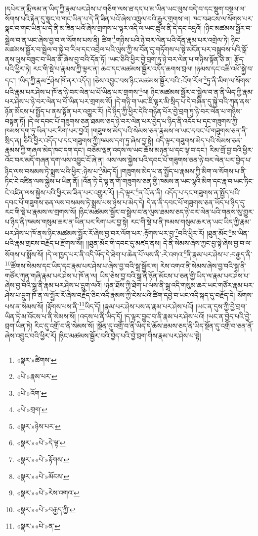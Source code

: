།དཔེར་ན་རྨི་ལམ་ན་ཡིད་ཀྱི་རྣམ་པར་ཤེས་པ་གཅིག་ལས་ཐ་དད་པ་མ་ཡིན་ཡང་ལུས་བདེ་བ་དང་སྡུག་བསྔལ་ལ་སོགས་པའི་རྟེན་དུ་སྣང་བ་གང་ཡིན་པ་དེ་ནི་ཟིན་པའོ་ཞེས་འཁྲུལ་བའི་རྒྱུར་གྲགས་ལ། ཁང་བཟངས་ལ་སོགས་པར་སྣང་བ་གང་ཡིན་པ་དེ་ནི་མ་ཟིན་པའོ་ཞེས་གྲགས་པ་ལྟར་འདི་ལ་ཡང་ཚུལ་ནི་དེ་དང་འདྲའོ། །ཉིང་མཚམས་སྦྱོར་བ་སྦྲེལ་བ་ན་ཡང་ཞེས་བྱ་བ་ལ་སོགས་པས་ནི། ཚིག་\footnote{«སྣར་»ཚིགས་}གཉིས་པའི་ཉེ་བར་ལེན་པའི་དོན་རྣམ་པར་འགྲེལ་ཏེ། ཉིང་མཚམས་སྦྱོར་བ་སྦྲེལ་བ་སྐྱེ་བ་རིལ་དང་འབྲེལ་པའི་ལུས་ཀྱི་ས་བོན་དུ་གཏོགས་པ་སྟེ་མངོན་པར་བསྒྲུབས་པའི་སྒོ་ནས་ལུས་བཟུང་བ་ཡིན་ནོ་ཞེས་བྱ་བའི་དོན་ཏོ། །ཡང་ཅིའི་ཕྱིར་བྱེ་བྲག་ཏུ་ཉེ་བར་ལེན་པ་གཉིས་སྟོན་ཅེ་ན། རྩོད་པའི་ཕྱིར་ཏེ། རང་གི་སྡེ་པ་རྣམས་ཀྱི་ལྟར་ན། ཆང་དང་མཚམས་སྦྱོར་འདོད་ཆགས་བྲལ། །ཉམས་དང་འཆི་འཕོ་སྐྱེ་བ་དང་། །ཡིད་ཀྱི་རྣམ་\footnote{«པེ་»རྣམ་པར་}ཤེས་ཁོ་ནར་འདོད། །ཅེས་འབྱུང་བས་ཉིང་མཚམས་སྦྱོར་བའི་:འོག་རོལ་\footnote{«པེ་»འོག་}ཏུ་ནི་མིག་ལ་སོགས་པའི་རྣམ་པར་ཤེས་པ་ཁོ་ན་ཉེ་བར་ལེན་པ་པོ་ཡིན་པར་གྲགས་\footnote{«པེ་»གྲག་}ལ། ཉིང་མཚམས་སྦྱོར་བ་སྦྲེལ་བ་ན་ནི་ཡིད་ཀྱི་རྣམ་པར་ཤེས་པ་ཉེ་བར་ལེན་པ་པོ་ཡིན་པར་གྲགས་སོ། །དེ་གཉི་ག་ཡང་ཇི་ལྟར་མི་སྲིད་པ་དེ་བཞིན་དུ་སྐྱེ་བའི་ཀུན་ནས་ཉོན་མོངས་པ་སྤྱོད་པ་ནས་སྟོན་པར་འགྱུར་རོ། །དེ་ཉིད་ཀྱི་ཕྱིར་དེའི་གཉེན་པོར་བྱེ་བྲག་ཏུ་ཉེ་བར་ལེན་པ་གཉིས་བསྟན་ཏོ། །དེ་ལ་དབང་པོ་གཟུགས་ཅན་ཐམས་ཅད་ཉེ་བར་ལེན་པར་བྱེད་པ་ཉིད་ནི་འདོད་པ་དང་གཟུགས་ཀྱི་ཁམས་དག་ཏུ་ཡིན་པར་རིག་པར་བྱའོ། །གཟུགས་མེད་པའི་སེམས་ཅན་རྣམས་ལ་ཡང་དབང་པོ་གཟུགས་ཅན་ནི་སྲིད་ན། ཅིའི་ཕྱིར་འདོད་པ་དང་གཟུགས་ཀྱི་ཁམས་དག་ཏུ་ཞེས་བྱ་སྟེ། འདི་ལྟར་གཟུགས་མེད་པའི་སེམས་ཅན་རྣམས་ཀྱི་གཞལ་མེད་ཁང་དག་དང་། བཅོམ་ལྡན་འདས་ལ་ཡང་ཆོས་མཉན་པ་དང་ལྟ་བ་དང་། རིམ་གྲོ་བྱ་བའི་ཕྱིར་འོང་བར་མདོ་གཞན་དག་ལས་འབྱུང་ངོ་ཞེ་ན། ལས་ལས་སྐྱེས་པའི་དབང་པོ་གཟུགས་ཅན་ཉེ་བར་ལེན་པར་བྱེད་པ་ཉིད་ལས་བསམས་ཏེ་སྨྲས་པའི་ཕྱིར་:ཉེས་པ་\footnote{«སྣར་»ཉེས་པར་}མེད་དོ། །གཟུགས་མེད་པ་ན་སྤྱོད་པ་རྣམས་ཀྱི་མིག་ལ་སོགས་པ་ནི་ཏིང་ངེ་འཛིན་ལས་སྐྱེས་པ་ཡིན་ནོ། །འོན་ཏེ་དེ་ལྟ་ན་གོ་གཟུགས་ཅན་གྱི་ཁམས་ན་ཡང་ལྷའི་མིག་དང་རྣ་བ་ཡང་ཏིང་ངེ་འཛིན་ལས་སྐྱེས་པའི་ཕྱིར་མ་ཟིན་པར་འགྱུར་རོ། །:དེ་ལྟར་\footnote{«སྣར་»«པེ་»དེ་ལྟ་}ན་འོ་ན་ནི། འདོད་པ་དང་གཟུགས་ན་སྤྱོད་པའི་དབང་པོ་གཟུགས་ཅན་ལས་བསམས་ཏེ་སྨྲས་པས་ཉེས་པ་མེད་དེ། དེ་ན་ནི་དབང་པོ་གཟུགས་ཅན་ཡོད་པ་ཉིད་དུ་རང་གི་སྡེ་པ་རྣམས་ལ་གྲགས་སོ། །ཉིང་མཚམས་སྦྱོར་བ་སྦྲེལ་བ་ན་ལུས་ཐམས་ཅད་ཉེ་བར་ལེན་པའི་གནས་སུ་གྱུར་པ་ཉིད་ནི་ཁམས་གསུམ་ཆར་ན་ཡིན་པར་རིག་པར་བྱ་སྟེ། རང་གི་སྡེ་པ་ནི་ཁམས་གསུམ་ཆར་ན་ཡང་ཡིད་ཀྱི་རྣམ་པར་ཤེས་པ་ཁོ་ནས་ཉིང་མཚམས་སྦྱོར་རོ་ཞེས་བྱ་བར་ལོག་པར་:རྟོགས་པར་བྱ་\footnote{«སྣར་»«པེ་»རྟོགས་}བའི་ཕྱིར་རོ། །ཐུན་མོང་\footnote{«སྣར་»«པེ་»མོངས་}མ་ཡིན་པའི་རྣམ་གྲངས་བརྗོད་པ་རྫོགས་སོ།། །།ཐུན་མོང་གི་དབང་དུ་མཛད་ནས། དེ་ནི་སེམས་ཞེས་ཀྱང་བྱ་སྟེ་ཞེས་བྱ་བ་ལ་སོགས་པ་སྨོས་སོ། །དེ་ལ་ཁྱད་པར་ནི་འདི་ཡོད་དེ་ཐེག་པ་ཆེན་པོ་ལས་ནི་:རེ་འགའ་\footnote{«སྣར་»«པེ་»རེས་འགའ་}ནི་རྣམ་པར་ཤེས་པ་:བརྒྱད་ནི་\footnote{«སྣར་»«པེ་»བརྒྱད་ཀྱི་}ཚོགས་སེམས་དང་ཡིད་དང་རྣམ་པར་ཤེས་པ་ཞེས་བྱ་བའི་སྒྲ་སྦྱོར་ལ། རེས་འགའ་ནི་སེམས་ཞེས་བྱ་བའི་སྒྲ་ནི་གཙོར་ཀུན་གཞི་རྣམ་པར་ཤེས་པ་ཁོ་ན་ལ། ཡིད་ཅེས་བྱ་བའི་སྒྲ་ནི་ཉོན་མོངས་པ་ཅན་གྱི་ཡིད་ལ་རྣམ་པར་ཤེས་པ་ཞེས་བྱ་བའི་སྒྲ་ནི་རྣམ་པར་ཤེས་པ་དྲུག་ལའོ། །ཉན་ཐོས་ཀྱི་ཐེག་པ་ལས་ནི་སྒྲ་འདི་གསུམ་ཆར་ཡང་གཙོར་རྣམ་པར་ཤེས་པ་དྲུག་ཁོ་ན་ལ་སྦྱོར་རོ་ཞེས་བརྗོད་ཅིང་འདི་རྣམས་ཀྱི་ངེས་པའི་ཚིག་དབྱེ་བ་ཡང་འདི་སྐད་དུ་བརྗོད་དེ། སོགས་པས་ན་སེམས་སོ། །རྟོགས་པས་ནི་\footnote{«སྣར་»«པེ་»ན་}ཡིད་དོ། །རྣམ་པར་ཤེས་པས་ན་རྣམ་པར་ཤེས་པའོ། །ཡང་ན་དུས་ཀྱི་བྱེ་བྲག་ཡིན་ཏེ་མ་འོངས་པ་ནི་སེམས་སོ། །འདས་པ་ནི་ཡིད་དོ། །ད་ལྟར་བྱུང་བ་ནི་རྣམ་པར་ཤེས་པའོ། །ཡང་ན་བྱེད་པའི་བྱེ་བྲག་ཡིན་ཏེ། རིང་དུ་འགྲོ་བ་ནི་སེམས་སོ། །སྔོན་དུ་འགྲོ་བ་ནི་ཡིད་དེ་ཆོས་ཐམས་ཅད་ནི་ཡིད་སྔོན་དུ་འགྲོ་བ་ཅན་ནོ་ཞེས་འབྱུང་བའི་ཕྱིར་རོ། །ཉིང་མཚམས་སྦྱོར་བའི་བྱེད་པའི་བྱེ་བྲག་གིས་རྣམ་པར་ཤེས་པ་སྟེ། 